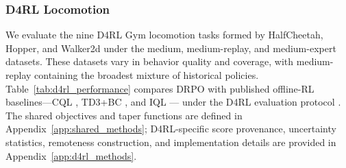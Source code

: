 \documentclass[sigconf,anonymous,review]{acmart}
\theoremstyle{acmdefinition}
\begin{document}

\subsubsection{D4RL Locomotion}
\label{sec:d4rl_performance}

We evaluate the nine D4RL Gym locomotion tasks formed by HalfCheetah,
Hopper, and Walker2d under the medium, medium-replay, and medium-expert
datasets. These datasets vary in behavior quality and coverage, with
medium-replay containing the broadest mixture of historical policies.
Table~\ref{tab:d4rl_performance} compares DRPO with published offline-RL
baselines---CQL \citep{kumar2020conservative}, TD3+BC
\citep{fujimoto2021minimalist}, and IQL \citep{kostrikov2021offline}---%
under the D4RL evaluation protocol \citep{fu2020d4rl,todorov2012mujoco}. The shared objectives and
taper functions are defined in Appendix~\ref{app:shared_methods};
D4RL-specific score provenance, uncertainty statistics, remoteness
construction, and implementation details are provided in
Appendix~\ref{app:d4rl_methods}.
\end{document}
